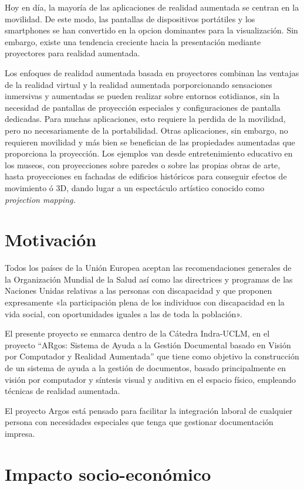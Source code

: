 Hoy en día, la mayoría de las aplicaciones de realidad aumentada se centran en la movilidad. De este modo, las pantallas de dispositivos portátiles y los smartphones se han convertido en la opcion dominantes para la visualización. Sin embargo, existe una tendencia creciente hacia la presentación mediante proyectores para realidad aumentada. 

Los enfoques de realidad aumentada basada en proyectores combinan las ventajas de la realidad virtual y la realidad aumentada porporcionando sensaciones inmersivas y aumentadas se pueden realizar sobre entornos cotidianos, sin la necesidad de pantallas de proyección especiales y configuraciones de pantalla dedicadas. Para muchas aplicaciones, esto requiere la perdida de la movilidad, pero no necesariamente de la portabilidad. Otras aplicaciones, sin embargo, no requieren movilidad y más bien se benefician de las propiedades aumentadas que proporciona la proyección. Los ejemplos van desde entretenimiento educativo en los museos, con proyecciones sobre paredes o sobre las propias obras de arte, hasta proyecciones en fachadas de edificios históricos para conseguir efectos de movimiento ó 3D, dando lugar a un espectáculo artístico conocido como \emph{projection mapping.}

\section{Motivación}
Todos los países de la Unión Europea aceptan las recomendaciones generales de la Organización Mundial de la Salud así como las directrices y programas de las Naciones Unidas relativas a las personas con discapacidad y que proponen expresamente «la participación plena de los individuos con discapacidad en la vida social, con oportunidades iguales a las de toda la población». 
 
El presente proyecto se enmarca dentro de la Cátedra Indra-UCLM, en el proyecto “ARgos: Sistema de Ayuda a la Gestión Documental basado en Visión por Computador y Realidad Aumentada” que tiene como objetivo la construcción de un sistema de ayuda a la gestión de documentos, basado principalmente en visión por computador y síntesis visual y auditiva en el espacio físico, empleando técnicas de realidad aumentada. 

El proyecto Argos está pensado para facilitar la integración laboral de cualquier persona con necesidades especiales que tenga que gestionar documentación impresa. 
  
\section{Impacto socio-económico}

